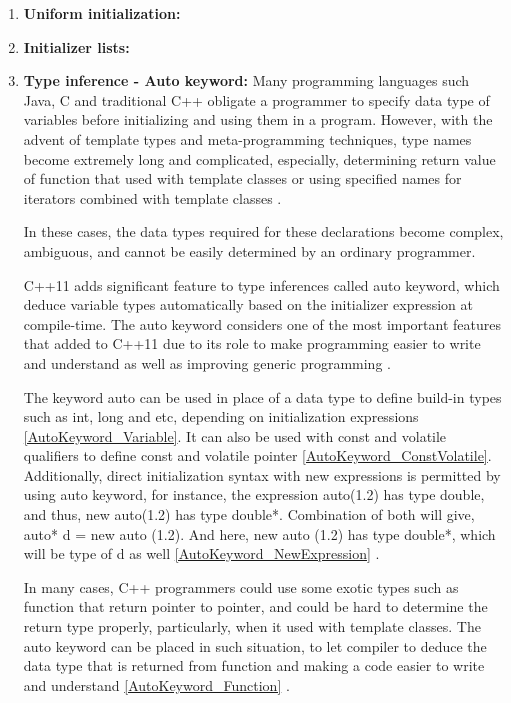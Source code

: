 \documentclass[11pt]{report}
\begin{document}
\begin{enumerate}
\item \textbf{Uniform initialization:}
\item \textbf{Initializer lists:}

\item \textbf{Type inference - Auto keyword:} Many programming languages such Java, C and traditional C++ obligate a programmer to specify data type of variables before initializing and using them in a program. However, with the advent of template types and meta-programming techniques, type names become extremely long and complicated, especially, determining return value of function that used with template classes or using specified names for iterators combined with template classes \cite{Horstmann:2008:BC}.
\newline

In these cases, the data types required for these declarations become complex, ambiguous, and cannot be easily determined by an ordinary programmer.
\newline

C++11 adds significant feature to type inferences called auto keyword, which deduce variable types automatically based on the initializer expression at compile-time.  The auto keyword considers one of the most important features that added to C++11 due to its role to make programming easier to write and understand as well as improving generic programming \cite{Gregorie:professionalcpp}.
\newline

The keyword auto can be used in place of a data type to define build-in types such as int, long and etc, depending on initialization expressions \ref{AutoKeyword_Variable}. It can also be used with const and volatile qualifiers to define const and volatile pointer \ref{AutoKeyword_ConstVolatile}. Additionally, direct initialization syntax with new expressions is permitted by using auto keyword, for instance, the expression auto(1.2) has type double, and thus, new auto(1.2) has type double*. Combination of both will give, auto* d = new auto (1.2). And here, new auto (1.2) has type double*, which will be type of d as well \ref{AutoKeyword_NewExpression} \cite{Stroustrup:2012:Cpp11}.

In many cases, C++ programmers could use some exotic types such as function that return pointer to pointer, and could be hard to determine the return type properly, particularly, when it used with template classes. The auto keyword can be placed in such situation, to let compiler to deduce the data type that is returned from function and making a code easier to write and understand \ref{AutoKeyword_Function} \cite{Overland:2011:CWF}.
\newline


\end{enumerate}
\end{document}
